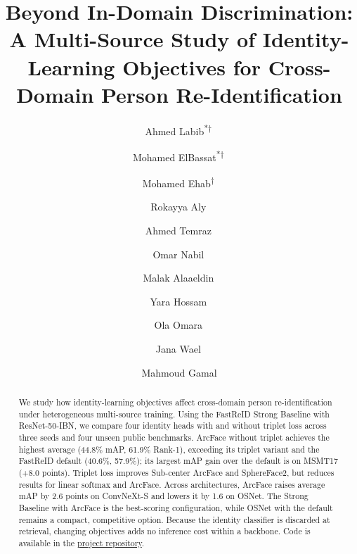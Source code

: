 \documentclass{llncs}
\begin{document}
\title{Beyond In-Domain Discrimination: A Multi-Source Study of Identity-Learning Objectives for Cross-Domain Person Re-Identification}

\author{Ahmed Labib\textsuperscript{*}\textsuperscript{\ensuremath{\dagger}}\, \and
Mohamed ElBassat\textsuperscript{*}\textsuperscript{\ensuremath{\dagger}}\, \and
Mohamed Ehab\textsuperscript{\ensuremath{\dagger}}\, \and
Rokayya Aly\, \and
Ahmed Temraz\, \and
Omar Nabil\, \and
Malak Alaaeldin\, \and
Yara Hossam\, \and
Ola Omara\, \and
Jana Wael\, \and
Mahmoud Gamal}



\maketitle

\begin{abstract}
We study how identity-learning objectives affect cross-domain person re-identification under heterogeneous multi-source training. Using the FastReID Strong Baseline with ResNet-50-IBN, we compare four identity heads with and without triplet loss across three seeds and four unseen public benchmarks. ArcFace without triplet achieves the highest average (44.8\% mAP, 61.9\% Rank-1), exceeding its triplet variant and the FastReID default (40.6\%, 57.9\%); its largest mAP gain over the default is on MSMT17 (+8.0 points). Triplet loss improves Sub-center ArcFace and SphereFace2, but reduces results for linear softmax and ArcFace. Across architectures, ArcFace raises average mAP by 2.6 points on ConvNeXt-S and lowers it by 1.6 on OSNet. The Strong Baseline with ArcFace is the best-scoring configuration, while OSNet with the default remains a compact, competitive option. Because the identity classifier is discarded at retrieval, changing objectives adds no inference cost within a backbone. Code is available in the \href{https://github.com/BASSAT-BASSAT/Beyond-In-Domain-Discrimination-For-Person-Re-ID-Official-Repo}{project repository}.
\end{abstract}
\end{document}
